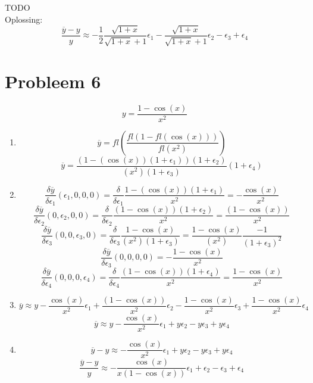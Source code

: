 \documentclass[12pt,a4paper]{article}
\begin{document}
TODO\\
Oplossing:
\[
\frac{\overline{y}-y}{y} \approx -\frac{1}{2}\frac{\sqrt{1+x}}{\sqrt{1+x}+1}\epsilon_1 - \frac{\sqrt{1+x}}{\sqrt{1+x}+1}\epsilon_2 - \epsilon_3+\epsilon_4
\]

\section{Probleem 6}

\[
y = \frac{1-\cos(x)}{x^2}
\]
\begin{enumerate}
\item
\[
\overline{y} = fl\left(\frac{fl(1-fl(\cos(x)))}{fl(x^2)}\right)
\]
\[
\overline{y} = \frac{(1-(\cos(x))(1+\epsilon_1))(1+\epsilon_2)}{(x^2)(1+\epsilon_3)}(1+\epsilon_4)
\]

\item
\[
\frac{\delta \overline{y}}{\delta \epsilon_1}(\epsilon_1,0,0,0)
= \frac{\delta}{\delta \epsilon_1}\frac{1-(\cos(x))(1+\epsilon_1)}{x^2} 
= -\frac{\cos(x)}{x^2}
\]
\[
\frac{\delta \overline{y}}{\delta \epsilon_2}(0,\epsilon_2,0,0)
= \frac{\delta}{\delta \epsilon_2}\frac{(1-\cos(x))(1+\epsilon_2)}{x^2}
= \frac{(1-\cos(x))}{x^2}
\]
\[
\frac{\delta \overline{y}}{\delta \epsilon_3}(0,0,\epsilon_3,0)
= \frac{\delta}{\delta \epsilon_3}\frac{1-\cos(x)}{(x^2)(1+\epsilon_3)} = \frac{1-\cos(x)}{(x^2)}\frac{-1}{(1+\epsilon_3)^2}
\]
\[
\frac{\delta \overline{y}}{\delta \epsilon_3}(0,0,0,0) = -\frac{1-\cos(x)}{x^2}
\]
\[
\frac{\delta \overline{y}}{\delta \epsilon_4}(0,0,0,\epsilon_4)
= \frac{\delta}{\delta \epsilon_4}\frac{(1-\cos(x))(1+\epsilon_4)}{x^2}
= \frac{1 - \cos(x)}{x^2}
\]

\item
\[
\overline{y} \approx y -\frac{\cos(x)}{x^2}\epsilon_1
+ \frac{(1-\cos(x))}{x^2}\epsilon_2
- \frac{1-\cos(x)}{x^2}\epsilon_3
+ \frac{1 - \cos(x)}{x^2}\epsilon_4
\]
\[
\overline{y} \approx y - \frac{\cos(x)}{x^2}\epsilon_1 + y\epsilon_2 - y\epsilon_3 + y\epsilon_4
\]
\item
\[
\overline{y}-y \approx - \frac{\cos(x)}{x^2}\epsilon_1 + y\epsilon_2 - y\epsilon_3 + y\epsilon_4
\]
\[
\frac{\overline{y}-y}{y} \approx - \frac{\cos(x)}{x(1-\cos(x))}\epsilon_1 + \epsilon_2 - \epsilon_3 + \epsilon_4
\]
\end{enumerate}
\end{document}
